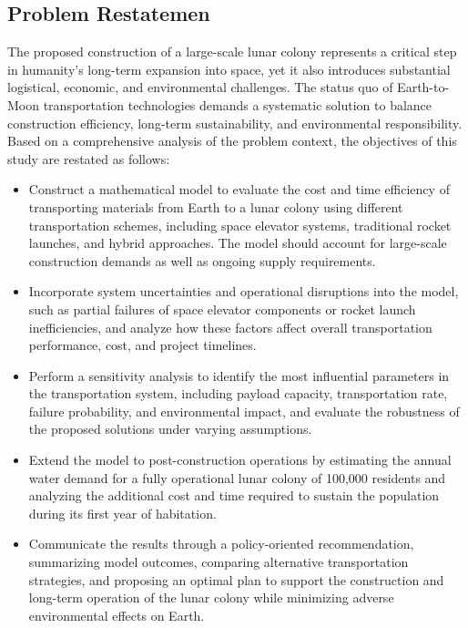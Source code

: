 ﻿\documentclass{mcmthesis}
\begin{document}

  
\subsection{Problem Restatemen}
The proposed construction of a large-scale lunar colony represents a critical step in humanity’s long-term expansion into space, yet it also introduces substantial logistical, economic, and environmental challenges. The status quo of Earth-to-Moon transportation technologies demands a systematic solution to balance construction efficiency, long-term sustainability, and environmental responsibility. Based on a comprehensive analysis of the problem context, the objectives of this study are restated as follows:

\begin{itemize}
\item
Construct a mathematical model to evaluate the cost and time efficiency of transporting materials from Earth to a lunar colony using different transportation schemes, including space elevator systems, traditional rocket launches, and hybrid approaches. The model should account for large-scale construction demands as well as ongoing supply requirements.

\item
Incorporate system uncertainties and operational disruptions into the model, such as partial failures of space elevator components or rocket launch inefficiencies, and analyze how these factors affect overall transportation performance, cost, and project timelines.

\item
Perform a sensitivity analysis to identify the most influential parameters in the transportation system, including payload capacity, transportation rate, failure probability, and environmental impact, and evaluate the robustness of the proposed solutions under varying assumptions.
\item
Extend the model to post-construction operations by estimating the annual water demand for a fully operational lunar colony of 100,000 residents and analyzing the additional cost and time required to sustain the population during its first year of habitation.
\item
Communicate the results through a policy-oriented recommendation, summarizing model outcomes, comparing alternative transportation strategies, and proposing an optimal plan to support the construction and long-term operation of the lunar colony while minimizing adverse environmental effects on Earth.
\end{itemize}
\end{document}
